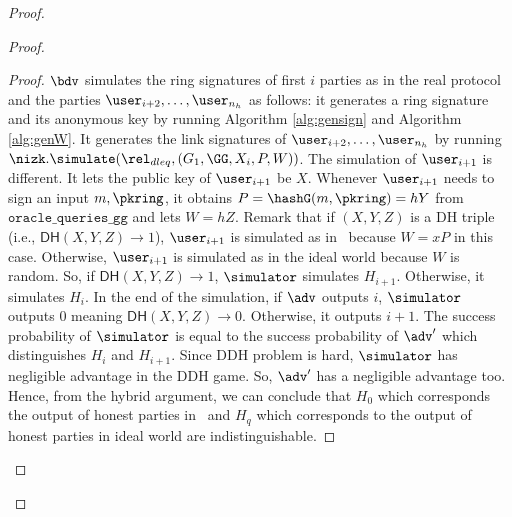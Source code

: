 \begin{proof}
\begin{proof}
\begin{proof}
			
			$\bdv $ simulates the ring signatures of first $ i $ parties as in the real protocol and the parties $ \user_{i+2}, \ldots, \user_{n_h} $ as follows: it generates a ring signature and its anonymous key by running Algorithm \ref{alg:gensign} and Algorithm \ref{alg:genW}. It generates the link signatures of $ \user_{i+2}, \ldots, \user_{n_h} $ by running $ \nizk.\simulate(\rel_{dleq}, (G_1, \GG,X_i, P,W)) $. The simulation of $ \user_{i + 1} $ is different. It lets the public key of $ \user_{i + 1} $ be $ X$. Whenever $ \user_{i+1} $ needs to sign an input $ m, \pkring $, it obtains $ P = \hashG(m, \pkring) = hY $ from $ \mathtt{oracle\_queries\_gg} $ and lets $ W = hZ $. Remark that if $ (X,Y,Z)$ is a DH triple (i.e., $  \mathsf{DH}(X,Y,Z) \rightarrow 1 $), $ \user_{i+1} $ is simulated as in \name \ because $ W = xP $ in this case. Otherwise, $ \user_{i+1} $ is simulated as in the ideal world because $ W $ is random. So, if $  \mathsf{DH}(X,Y,Z)  \rightarrow 1$, $\simulator $ simulates $ H_{i+1} $. Otherwise, it simulates $ H_{i} $. In the end of the simulation, if $ \adv $ outputs $ i $, $\simulator $ outputs $ 0 $ meaning $  \mathsf{DH}(X,Y,Z) \rightarrow 0$. Otherwise, it outputs $ i + 1 $. The success probability of $\simulator $ is equal to the success probability of $ \adv' $ which distinguishes $ H_i $ and $ H_{i +1} $. Since DDH problem is hard, $\simulator $ has negligible advantage in the DDH game. So, $ \adv' $ has a negligible advantage too. Hence, from the hybrid argument, we can conclude that $ H_0    $ which corresponds the output of honest parties in  \name\ and $ H_q  $ which corresponds to  the output of honest parties in ideal world are indistinguishable.
			

\end{proof}
\end{proof}
\end{proof}

